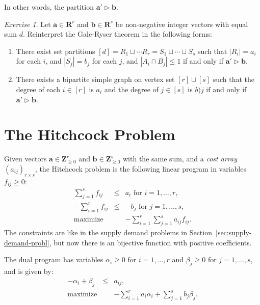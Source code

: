 \documentclass{amsbook}
\newcommand{\bb}{\mathbf b}
\renewcommand{\aa}{\mathbf a}
\newcommand{\RR}{\mathbf R}
\newcommand{\ZZ}{\mathbf Z}
\theoremstyle{definition}
\theoremstyle{remark}
\newtheorem{exercise}[theorem]{Exercise}
\begin{document}
In other words, the partition $\aa'\rhd \bb$.
\begin{exercise}
  Let $\aa\in \RR^r$ and $\bb\in \RR^s$ be non-negative integer vectors with equal sum $d$.
  Reinterpret the Gale-Ryser theorem in the following forms:
  \begin{enumerate}
  \item There exist set partitions $[d]=R_1\sqcup \dotsb R_r=S_1\sqcup\dotsb\sqcup S_s$ such that $|R_i|=a_i$ for each $i$, and $|S_j|=b_j$ for each $j$, and $|A_i\cap B_j|\leq 1$ if and only if $\aa'\rhd \bb$.
  \item There exists a bipartite simple graph on vertex set $[r]\sqcup [s]$ such that the degree of each $i\in [r]$ is $a_i$ and the degree of $j\in [s]$ is $b)j$ if and only if $\aa'\rhd \bb$.
  \end{enumerate}
\end{exercise}

\section{The Hitchcock Problem}
\label{sec:hitchcock-problem}

Given vectors $\aa\in \ZZ_{\geq 0}^r$ and $\bb \in \ZZ_{\geq 0}^s$ with the same sum, and a \emph{cost array} $(a_{ij})_{r\times s}$, the Hitchcock problem is the following linear program in variables $f_{ij}\geq 0$:
\begin{equation}
  \tag{H}
  \label{eq:hitchcock}
  \begin{array}{rcl}
    \sum_{j=1}^s f_{ij} & \leq & a_i \text{ for }i=1,\dotsc,r,\\
    -\sum_{i=1}^r f_{ij} & \leq & -b_j \text{ for }j=1,\dotsc,s,\\
    \hline
    \text{maximize} && - \sum_{i=1}^r\sum_{j=1}^s a_{ij}f_{ij}.
  \end{array}
\end{equation}
The constraints are like in the supply demand problems in Section~\ref{sec:supply-demand-probl}, but now there is an bijective function with positive coefficients.

The dual program has variables $\alpha_i\geq 0$ for $i=1,\dotsc,r$ and $\beta_j\geq 0$ for $j=1,\dotsc,s$, and is given by:
\begin{equation}
  \tag{DH}
  \label{eq:dual-hitch}
  \begin{array}{rcl}
    -\alpha_i + \beta_j & \leq & a_{ij},\\
    \text{maximize} && -\sum_{i=1}^r a_i\alpha_i + \sum_{j=1}^s b_j\beta_j.
  \end{array}
\end{equation}
\end{document}
